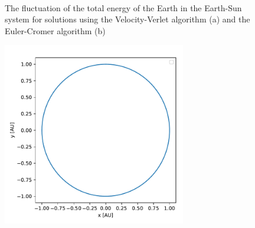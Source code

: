 \documentclass[10pt,showpacs,preprintnumbers,footinbib,amsmath,amssymb,aps,prl,twocolumn,groupedaddress,superscriptaddress,showkeys]{revtex4-1}
\begin{document}
\begin{figure}[h!tb]
  \center
  \\
   \caption{The fluctuation of the total energy of the Earth in the Earth-Sun system for solutions using the Velocity-Verlet algorithm (a) and the Euler-Cromer algorithm (b)}
   \label{steady_state}
\end{figure}

\begin{figure}[h!tb]
  \center
  \includegraphics[width=8cm]{figs/exb_orbit_verlet.pdf}
\end{figure}
\end{document}
